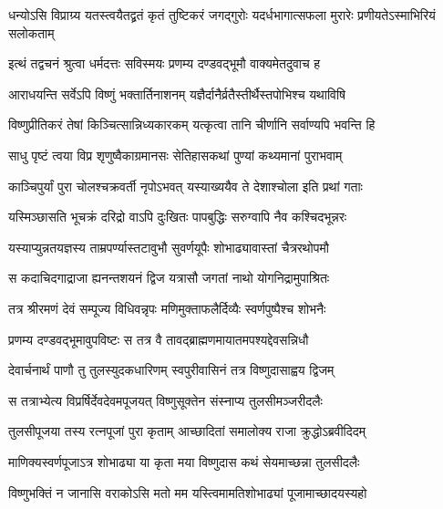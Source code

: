 \twolineshloka
{धन्योऽसि विप्राग्र्य यतस्त्वयैतद्व्रतं कृतं तुष्टिकरं जगद्गुरोः}
{यदर्धभागात्सफला मुरारेः प्रणीयतेऽस्माभिरियं सलोकताम्} %





\twolineshloka
{इत्थं तद्वचनं श्रुत्वा धर्मदत्तः सविस्मयः}
{प्रणम्य दण्डवद्भूमौ वाक्यमेतदुवाच ह} %

\twolineshloka
{आराधयन्ति सर्वेऽपि विष्णुं भक्तार्तिनाशनम्}
{यज्ञैर्दानैर्व्रतैस्तीर्थैस्तपोभिश्च यथाविषि} %

\twolineshloka
{विष्णुप्रीतिकरं तेषां किञ्चित्सान्निध्यकारकम्}
{यत्कृत्वा तानि चीर्णानि सर्वाण्यपि भवन्ति हि} %


\twolineshloka
{साधु पृष्टं त्वया विप्र शृणुष्वैकाग्रमानसः}
{सेतिहासकथां पुण्यां कथ्यमानां पुराभवाम्} %


\twolineshloka
{काञ्चिपुर्यां पुरा चोलश्चक्रवर्ती नृपोऽभवत्}
{यस्याख्ययैव ते देशाश्चोला इति प्रथां गताः} %

\twolineshloka
{यस्मिञ्छासति भूचक्रं दरिद्रो वाऽपि दुःखितः}
{पापबुद्धिः सरुग्वापि नैव कश्चिदभून्नरः} %

\twolineshloka
{यस्याप्युन्नतयज्ञस्य ताम्रपर्ण्यास्तटावुभौ}
{सुवर्णयूपैः शोभाढ्यावास्तां चैत्ररथोपमौ} %

\twolineshloka
{स कदाचिदगाद्राजा ह्यनन्तशयनं द्विज}
{यत्रासौ जगतां नाथो योगनिद्रामुपाश्रितः} %

\twolineshloka
{तत्र श्रीरमणं देवं सम्पूज्य विधिवन्नृपः}
{मणिमुक्ताफलैर्दिव्यैः स्वर्णपुष्पैश्च शोभनैः} %

\twolineshloka
{प्रणम्य दण्डवद्भूमावुपविष्टः स तत्र वै}
{तावद्ब्राह्मणमायातमपश्यद्देवसन्निधौ} %

\twolineshloka
{देवार्चनार्थं पाणौ तु तुलस्युदकधारिणम्}
{स्वपुरीवासिनं तत्र विष्णुदासाह्वय द्विजम्} %

\twolineshloka
{स तत्राभ्येत्य विप्रर्षिर्देवदेवमपूजयत्}
{विष्णुसूक्तेन संस्नाप्य तुलसीमञ्जरीदलैः} %

\twolineshloka
{तुलसीपूजया तस्य रत्नपूजां पुरा कृताम्}
{आच्छादितां समालोक्य राजा क्रुद्धोऽब्रवीदिदम्} %


\twolineshloka
{माणिक्यस्वर्णपूजाऽत्र शोभाढ्या या कृता मया}
{विष्णुदास कथं सेयमाच्छन्ना तुलसीदलैः} %

\twolineshloka
{विष्णुभक्तिं न जानासि वराकोऽसि मतो मम}
{यस्त्विमामतिशोभाढ्यां पूजामाच्छादयस्यहो} %

